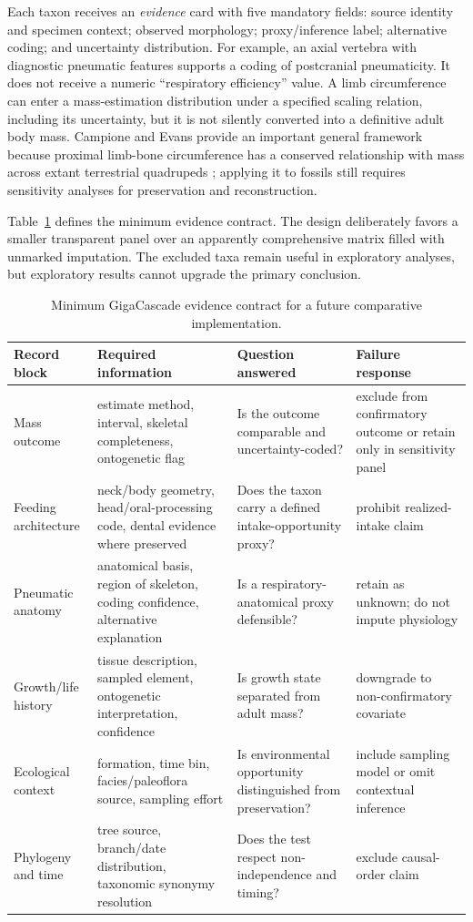 \documentclass[conference]{IEEEtran}
\newcommand{\gc}{GigaCascade}
\newcommand{\evidence}{\textit{evidence}}
\begin{document}
Each taxon receives an \evidence{} card with five mandatory fields: source identity and specimen context; observed morphology; proxy/inference label; alternative coding; and uncertainty distribution. For example, an axial vertebra with diagnostic pneumatic features supports a coding of postcranial pneumaticity. It does not receive a numeric ``respiratory efficiency'' value. A limb circumference can enter a mass-estimation distribution under a specified scaling relation, including its uncertainty, but it is not silently converted into a definitive adult body mass. Campione and Evans provide an important general framework because proximal limb-bone circumference has a conserved relationship with mass across extant terrestrial quadrupeds \cite{campione2012}; applying it to fossils still requires sensitivity analyses for preservation and reconstruction.

Table~\ref{tab:matrix} defines the minimum evidence contract. The design deliberately favors a smaller transparent panel over an apparently comprehensive matrix filled with unmarked imputation. The excluded taxa remain useful in exploratory analyses, but exploratory results cannot upgrade the primary conclusion.

\begin{table}[!t]
\caption{Minimum \gc{} evidence contract for a future comparative implementation.}
\label{tab:matrix}
\centering
\scriptsize
\begin{tabular}{|p{}|p{}|p{}|p{}|}
\hline
Record block & Required information & Question answered & Failure response \\
\hline
Mass outcome & estimate method, interval, skeletal completeness, ontogenetic flag & Is the outcome comparable and uncertainty-coded? & exclude from confirmatory outcome or retain only in sensitivity panel \\
\hline
Feeding architecture & neck/body geometry, head/oral-processing code, dental evidence where preserved & Does the taxon carry a defined intake-opportunity proxy? & prohibit realized-intake claim \\
\hline
Pneumatic anatomy & anatomical basis, region of skeleton, coding confidence, alternative explanation & Is a respiratory-anatomical proxy defensible? & retain as unknown; do not impute physiology \\
\hline
Growth/life history & tissue description, sampled element, ontogenetic interpretation, confidence & Is growth state separated from adult mass? & downgrade to non-confirmatory covariate \\
\hline
Ecological context & formation, time bin, facies/paleoflora source, sampling effort & Is environmental opportunity distinguished from preservation? & include sampling model or omit contextual inference \\
\hline
Phylogeny and time & tree source, branch/date distribution, taxonomic synonymy resolution & Does the test respect non-independence and timing? & exclude causal-order claim \\
\hline
\end{tabular}
\end{table}
\end{document}
